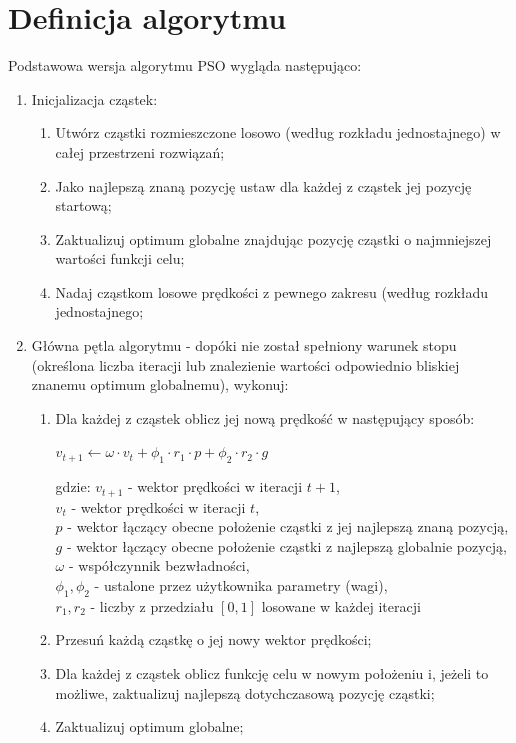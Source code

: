 \documentclass[12pt, twoside, openany, abstract=on]{report}
\theoremstyle{definition}
\begin{document}
\section{Definicja algorytmu}

Podstawowa wersja algorytmu PSO wygląda następująco:

\begin{enumerate}
\item Inicjalizacja cząstek:

\begin{enumerate}
\item Utwórz cząstki rozmieszczone losowo (według rozkładu jednostajnego) w całej przestrzeni rozwiązań;
\item Jako najlepszą znaną pozycję ustaw dla każdej z cząstek jej pozycję startową; 
\item Zaktualizuj optimum globalne znajdując pozycję cząstki o najmniejszej wartości funkcji celu; 
\item Nadaj cząstkom losowe prędkości z pewnego zakresu (według rozkładu jednostajnego; 
\end{enumerate}

\item Główna pętla algorytmu - dopóki nie został spełniony warunek stopu (określona liczba iteracji lub znalezienie wartości odpowiednio bliskiej znanemu optimum globalnemu), wykonuj:
\begin{enumerate}

\item Dla każdej z cząstek oblicz jej nową prędkość w następujący sposób:

\begin{center}

$v_{t+1} \leftarrow \omega \cdot v_t + \phi_1 \cdot r_1 \cdot p + \phi_2 \cdot r_2 \cdot g$

\end{center}

gdzie:
$v_{t+1}$ - wektor prędkości w iteracji $t+1$,\\
$v_t$ - wektor prędkości w iteracji $t$,\\
$p$ - wektor łączący obecne położenie cząstki z jej najlepszą znaną pozycją,\\
$g$ - wektor łączący obecne położenie cząstki z najlepszą globalnie pozycją,\\
$\omega$ - współczynnik bezwładności,\\
$\phi_1, \phi_2$ - ustalone przez użytkownika parametry (wagi),\\
$r_1, r_2$ - liczby z przedziału $[0,1]$ losowane w każdej iteracji\\

\item Przesuń każdą cząstkę o jej nowy wektor prędkości;
\item Dla każdej z cząstek oblicz funkcję celu w nowym położeniu i, jeżeli to możliwe, zaktualizuj najlepszą dotychczasową pozycję cząstki; 
\item Zaktualizuj optimum globalne; 
\end{enumerate}
\end{enumerate}
\end{document}
